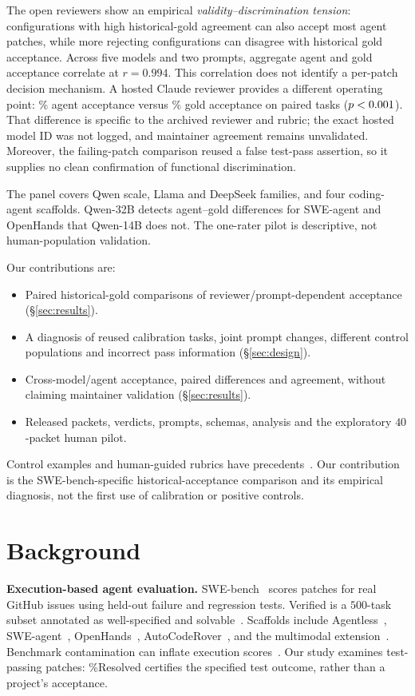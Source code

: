 \documentclass[10pt,conference]{IEEEtran}
\begin{document}
The open reviewers show an empirical \emph{validity--discrimination tension}: configurations
with high historical-gold agreement can also accept most agent patches, while more rejecting
configurations can disagree with historical gold acceptance. Across five models and two
prompts, aggregate agent and gold acceptance correlate at $r=0.994$. This correlation does
not identify a per-patch decision mechanism. A hosted Claude reviewer provides a different
operating point: \frontAgent\% agent acceptance versus \frontGold\% gold acceptance on
\frontNpair{} paired tasks ($p<0.001$). That difference is specific to the archived
reviewer and rubric; the exact hosted model ID was not logged, and maintainer agreement
remains unvalidated. Moreover, the failing-patch comparison reused a false test-pass
assertion, so it supplies no clean confirmation of functional discrimination.

The panel covers Qwen scale, Llama and DeepSeek families, and four coding-agent scaffolds.
Qwen-32B detects agent--gold differences for SWE-agent and OpenHands that Qwen-14B does
not. The one-rater pilot is descriptive, not human-population validation.

\noindent Our contributions are:
\begin{itemize}
\item Paired historical-gold comparisons of reviewer/prompt-dependent acceptance
(\S\ref{sec:results}).
\item A diagnosis of reused calibration tasks, joint prompt changes, different control
populations and incorrect pass information (\S\ref{sec:design}).
\item Cross-model/agent acceptance, paired differences and agreement, without claiming
maintainer validation (\S\ref{sec:results}).
\item Released packets, verdicts, prompts, schemas, analysis and the exploratory
$40$-packet human pilot.
\end{itemize}
Control examples and human-guided rubrics have precedents~\cite{cihanreview,hitlpatch}.
Our contribution is the SWE-bench-specific historical-acceptance comparison and its
empirical diagnosis, not the first use of calibration or positive controls.

\section{Background}
\textbf{Execution-based agent evaluation.} SWE-bench~\cite{swebench} scores patches for
real GitHub issues using held-out failure and regression tests. Verified is a $500$-task
subset annotated as well-specified and solvable~\cite{swebenchverified}. Scaffolds include Agentless~\cite{agentless},
SWE-agent~\cite{sweagent}, OpenHands~\cite{wang2024openhands},
AutoCodeRover~\cite{zhang2024autocoderover}, and the multimodal
extension~\cite{yang2024swebenchmm}. Benchmark contamination can inflate execution
scores~\cite{riddell2024contamination}. Our study examines test-passing patches:
\%Resolved certifies the specified test outcome, rather than a project's acceptance.
\end{document}
